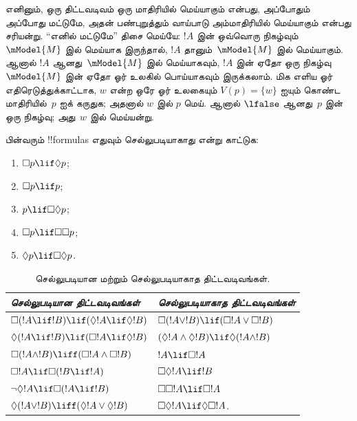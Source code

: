 \documentclass[../../../include/open-logic-section]{subfiles}
\begin{document}
எனினும், ஒரு திட்டவடிவம் ஒரு மாதிரியில் மெய்யாகும் என்பது, அப்போதும்
அப்போது மட்டுமே, அதன் பண்புறுத்தும் வாய்பாடு அம்மாதிரியில் மெய்யாகும்
என்பது சரியன்று. ``எனில் மட்டுமே'' திசை மெய்யே: $!A$ இன் ஒவ்வொரு
நிகழ்வும்~$\mModel{M}$ இல் மெய்யாக இருந்தால், $!A$ தானும்~$\mModel{M}$
இல் மெய்யாகும். ஆனால் $!A$ ஆனது~$\mModel{M}$ இல் மெய்யாகவும், $!A$ இன்
ஏதோ ஒரு நிகழ்வு~$\mModel{M}$ இன் ஏதோ ஓர் உலகில் பொய்யாகவும் இருக்கலாம்.
மிக எளிய ஓர் எதிரெடுத்துக்காட்டாக, $w$ என்ற ஒரே ஓர் உலகையும்
$V(p) = \{w\}$ ஐயும் கொண்ட மாதிரியில்~$p$ ஐக் கருதுக; அதனால் $w$ இல்
$p$ மெய். ஆனால் $\lfalse$ ஆனது~$p$ இன் ஒரு நிகழ்வு; அது~$w$ இல்
மெய்யன்று.

\begin{prob}
  பின்வரும் !!{formula}s எதுவும் செல்லுபடியாகாது என்று காட்டுக:
  \begin{enumerate}
    \item[\Ax{D}:] \quad $\Box p \lif \Diamond p$;
    \item[\Ax{T}:] \quad $\Box p \lif p$;
    \item[\Ax{B}:] \quad $p \lif \Box\Diamond p$;
    \item[\Ax{4}:] \quad $\Box p \lif \Box \Box p$;
    \item[\Ax{5}:] \quad $\Diamond p \lif \Box \Diamond
      p$.
  \end{enumerate}
\end{prob}

\begin{table}[t]
    \centering
    \begin{tabular}{| l || l |}
      \hline
      {\emph{செல்லுபடியான திட்டவடிவங்கள்}} & {\emph{செல்லுபடியாகாத திட்டவடிவங்கள்}} \\
      \hline\hline
      $\Box(!A \lif !B) \lif (\Diamond !A \lif \Diamond !B)$
      & $\Box (!A \lor !B) \lif (\Box !A \lor \Box !B)$ \\
      $\Diamond (!A \lif !B) \lif (\Box !A \lif \Diamond
      !B)$
      & $(\Diamond !A \land \Diamond !B) \lif \Diamond (!A
      \land !B)$\\
      $\Box (!A \land !B) \liff (\Box !A \land \Box !B)$
      & $!A \lif \Box !A$ \\
      $\Box !A \lif \Box (!B \lif !A)$
      & $\Box \Diamond !A \lif !B$ \\
      $\lnot \Diamond !A \lif \Box (!A \lif !B)$
      & $\Box \Box !A \lif \Box !A$ \\
      $\Diamond (!A \lor !B) \liff (\Diamond !A \lor
      \Diamond !B)$
      & $\Box \Diamond !A \lif \Diamond \Box !A$. \\
      \hline
    \end{tabular}
    \caption{செல்லுபடியான மற்றும் செல்லுபடியாகாத திட்டவடிவங்கள்.}
\end{table}
\end{document}
